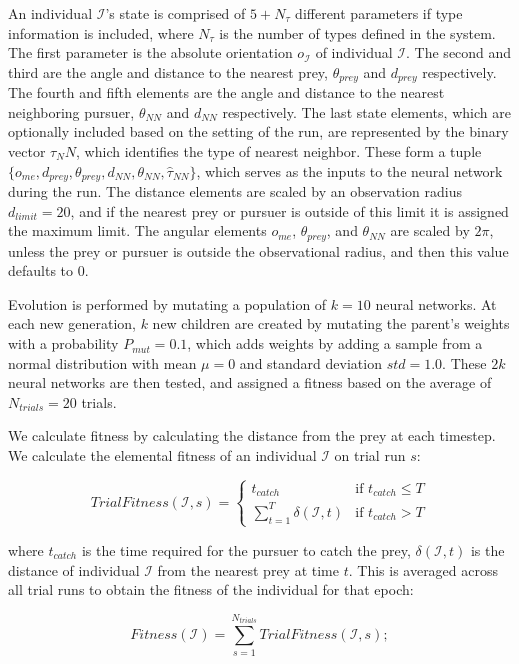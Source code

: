 \documentclass{aamas2014}
\begin{document}
An individual $\mathcal{I}$'s state is comprised of $5+N_{\tau}$ different parameters if type information is included, where $N_{\tau}$ is the number of types defined in the system. The first parameter is the absolute orientation $o_{\mathcal{I}}$ of individual $\mathcal{I}$. The second and third are the angle and distance to the nearest prey, $\theta_{prey}$ and $d_{prey}$ respectively. The fourth and fifth elements are the angle and distance to the nearest neighboring pursuer, $\theta_{NN}$ and $d_{NN}$ respectively. The last state elements, which are optionally included based on the setting of the run, are represented by the binary vector $\tau_NN$, which identifies the type of nearest neighbor. These form a tuple $\{o_{me},d_{prey},\theta_{prey},d_{NN}, \theta_{NN},\hat{\tau}_{NN}\}$, which serves as the inputs to the neural network during the run. The distance elements are scaled by an observation radius $d_{limit}=20$, and if the nearest prey or pursuer is outside of this limit it is assigned the maximum limit. The angular elements $o_{me}$, $\theta_{prey}$, and $\theta_{NN}$ are scaled by $2\pi$, unless the prey or pursuer is outside the observational radius, and then this value defaults to 0.

Evolution is performed by mutating a population of $k=10$ neural networks. At each new generation, $k$ new children are created by mutating the parent's weights with a probability $P_{mut}=0.1$, which adds weights by adding a sample from a normal distribution with mean $\mu=0$ and standard deviation $std=1.0$. These $2k$ neural networks are then tested, and assigned a fitness based on the average of $N_{trials}=20$ trials.

We calculate fitness by calculating the distance from the prey at each timestep. We calculate the elemental fitness of an individual $\mathcal{I}$ on trial run $s$:


\[
 TrialFitness(\mathcal{I},s) =
  \begin{cases}
   t_{catch} & \text{if } t_{catch} \leq T \\
   \sum_{t=1}^T \delta(\mathcal{I},t)       & \text{if } t_{catch} > T
  \end{cases}
\]

where $t_{catch}$ is the time required for the pursuer to catch the prey, $\delta(\mathcal{I},t)$ is the distance of individual $\mathcal{I}$ from the nearest prey at time $t$. This is averaged across all trial runs to obtain the fitness of the individual for that epoch:

\begin{equation*}
Fitness(\mathcal{I}) = \sum_{s=1}^{N_{trials}} TrialFitness(\mathcal{I},s);
\end{equation*}
\end{document}

